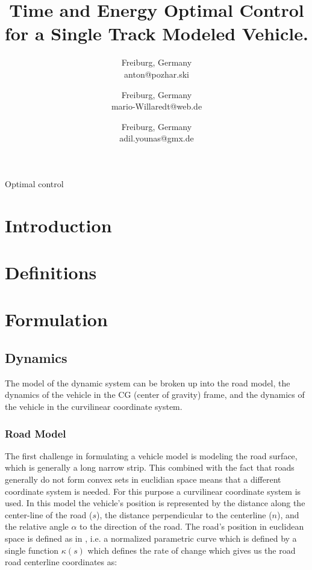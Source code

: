 \documentclass[conference,11pt]{IEEEtran}
\begin{document}
\title{Time and Energy Optimal Control for a Single Track Modeled Vehicle.}

\author{
Freiburg, Germany \\
anton@pozhar.ski
\and
{}
Freiburg, Germany \\
mario-Willaredt@web.de
\and
{}
Freiburg, Germany \\
adil.younas@gmx.de
}

\maketitle

\begin{abstract}
  
\end{abstract}

\begin{IEEEkeywords}
Optimal control
\end{IEEEkeywords}

\section{Introduction}

\section{Definitions}

\section{Formulation}
\subsection{Dynamics}
The model of the dynamic system can be broken up into the road model, the dynamics of the vehicle in the CG (center of gravity) frame, and the dynamics of the vehicle in the
curvilinear coordinate system.

\subsubsection{Road Model}
The first challenge in formulating a vehicle model is modeling the road surface, which is generally a long narrow strip. This combined with the fact that roads generally do not
form convex sets in euclidian space means that a different coordinate system is needed. For this purpose a curvilinear coordinate system is used. In this model the vehicle's
position is represented by the distance along the center-line of the road ($s$), the distance perpendicular to the centerline ($n$), and the relative angle $\alpha$ to the direction
of the road. The road's position in euclidean space is defined as in \cite{LOT20147559}, i.e. a normalized parametric curve which is defined by a single function $\kappa(s)$ which defines
the rate of change which gives us the road road centerline coordinates as:
\end{document}

